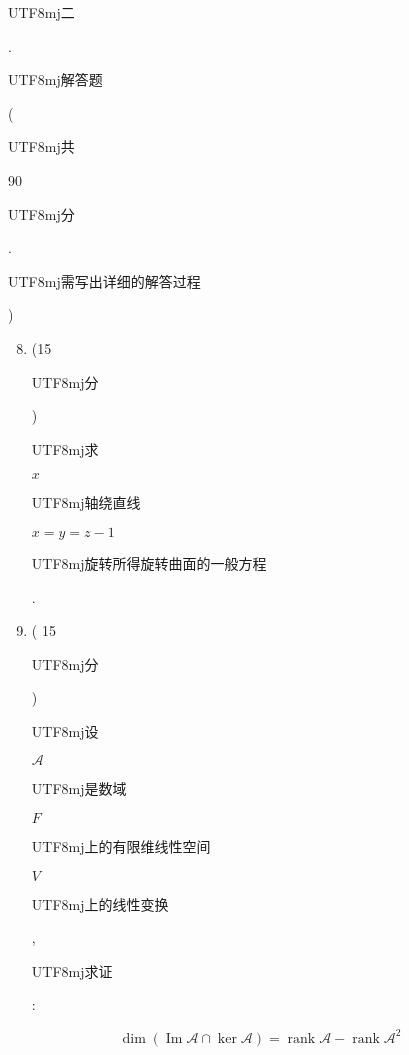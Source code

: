 \documentclass[10pt]{article}
\begin{document}
\begin{CJK}{UTF8}{mj}二\end{CJK}. \begin{CJK}{UTF8}{mj}解答题\end{CJK}(\begin{CJK}{UTF8}{mj}共\end{CJK} 90 \begin{CJK}{UTF8}{mj}分\end{CJK}. \begin{CJK}{UTF8}{mj}需写出详细的解答过程\end{CJK})

\begin{enumerate}
  \setcounter{enumi}{7}
  \item (15 \begin{CJK}{UTF8}{mj}分\end{CJK}) \begin{CJK}{UTF8}{mj}求\end{CJK} $x$ \begin{CJK}{UTF8}{mj}轴绕直线\end{CJK} $x=y=z-1$ \begin{CJK}{UTF8}{mj}旋转所得旋转曲面的一般方程\end{CJK}.

  \item ( 15 \begin{CJK}{UTF8}{mj}分\end{CJK}) \begin{CJK}{UTF8}{mj}设\end{CJK} $\mathscr{A}$ \begin{CJK}{UTF8}{mj}是数域\end{CJK} $F$ \begin{CJK}{UTF8}{mj}上的有限维线性空间\end{CJK} $V$ \begin{CJK}{UTF8}{mj}上的线性变换\end{CJK}, \begin{CJK}{UTF8}{mj}求证\end{CJK}:

\end{enumerate}
$$
\operatorname{dim}(\operatorname{Im} \mathscr{A} \cap \operatorname{ker} \mathscr{A})=\operatorname{rank} \mathscr{A}-\operatorname{rank} \mathscr{A}^{2}
$$
\end{document}
